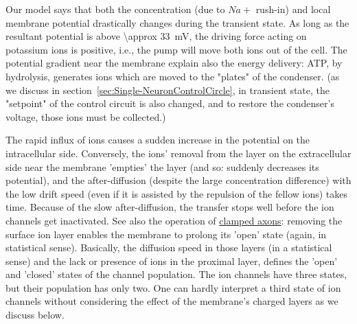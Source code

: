 Our model says that both the concentration (due to $Na+$ rush-in) and local membrane potential drastically changes
during the transient state. As long as the resultant potential is above
\SI{\approx 33}{\milli\volt},
the driving force acting on potassium ions is
positive, i.e., the pump will move both ions out of the cell.
The potential gradient near the membrane explain also the energy delivery: \gls{ATP},
by hydrolysis, generates ions which are moved
to the "plates" of the condenser. (as we discuss in section~\ref{sec:Single-NeuronControlCircle}, in transient state,
the "setpoint" of the control circuit is also changed, and to restore the condenser's voltage, those ions must be collected.)



The rapid influx of ions
causes a sudden increase in the potential on the intracellular side.
Conversely, the ions' removal from the layer on the extracellular
side near the membrane 'empties' the layer (and so: suddenly decreases its potential), and the after-diffusion
(despite the large concentration difference) with the low drift speed
(even if it is assisted by the repulsion of the fellow ions)
takes time. Because of the slow after-diffusion, the transfer stops well before
the ion channels get inactivated.
See also the operation of \hyperlink{voltage-clamping}{clamped axons}: removing the surface ion layer enables the membrane
to prolong its 'open' state (again, in statistical sense).
Basically, the diffusion speed in those layers
(in a statistical sense) and the lack or presence of ions in the proximal layer,
defines the 'open' and 'closed' states of the channel population.
The ion channels have three states, but their population has only two.
One can hardly interpret a third state of ion channels without considering
the effect of the membrane's charged layers as we discuss below.


